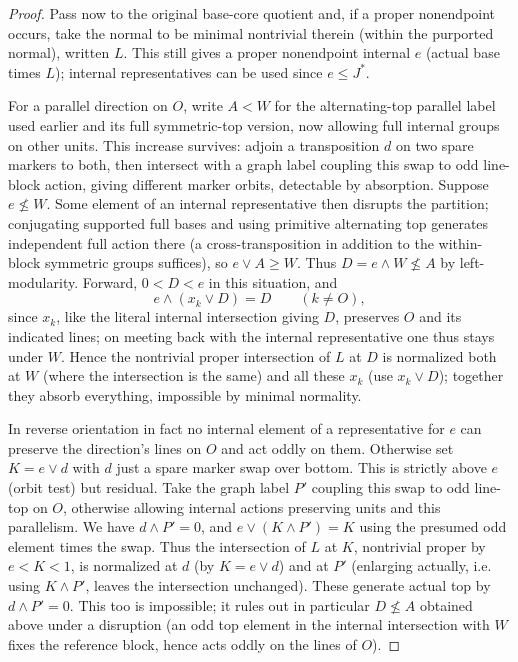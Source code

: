\begin{proof}
Pass now to the original base-core quotient and, if a proper nonendpoint occurs, take the normal
to be minimal nontrivial therein (within the purported normal), written \(L\). This still gives a
proper nonendpoint internal \(e\) (actual base times \(L\)); internal representatives can be used
since \(e\le J^*\).

For a parallel direction on \(O\), write \(A<W\) for the alternating-top parallel label used
earlier and its full symmetric-top version, now allowing full internal groups on other units. This
increase survives: adjoin a transposition \(d\) on two spare markers to both, then intersect with
a graph label coupling this swap to odd line-block action, giving different marker orbits,
detectable by absorption. Suppose \(e\not\le W\). Some element of an internal representative then
disrupts the partition; conjugating supported full bases and using primitive alternating top
generates independent full action there (a cross-transposition in addition to the within-block
symmetric groups suffices), so \(e\vee A\ge W\). Thus \(D=e\wedge W\not\le A\) by left-modularity.
Forward, \(0<D<e\) in this situation, and
\[
                  e\wedge(x_k\vee D)=D\qquad(k\ne O),
\]
since \(x_k\), like the literal internal intersection giving \(D\), preserves \(O\) and its
indicated lines; on meeting back with the internal representative one thus stays under \(W\).
Hence the nontrivial proper intersection of \(L\) at \(D\) is normalized both at \(W\) (where the
intersection is the same) and all these \(x_k\) (use \(x_k\vee D\)); together they absorb
everything, impossible by minimal normality.

In reverse orientation in fact no internal element of a representative for \(e\) can preserve the
direction's lines on \(O\) and act oddly on them. Otherwise set \(K=e\vee d\) with \(d\) just a
spare marker swap over bottom. This is strictly above \(e\) (orbit test) but residual. Take the
graph label \(P'\) coupling this swap to odd line-top on \(O\), otherwise allowing internal
actions preserving units and this parallelism. We have \(d\wedge P'=0\), and \(e\vee(K\wedge
P')=K\) using the presumed odd element times the swap. Thus the intersection of \(L\) at \(K\),
nontrivial proper by \(e<K<1\), is normalized at \(d\) (by \(K=e\vee d\)) and at \(P'\) (enlarging
actually, i.e. using \(K\wedge P'\), leaves the intersection unchanged). These generate actual top
by \(d\wedge P'=0\). This too is impossible; it rules out in particular \(D\not\le A\) obtained
above under a disruption (an odd top element in the internal intersection with \(W\) fixes the
reference block, hence acts oddly on the lines of \(O\)).


\end{proof}
